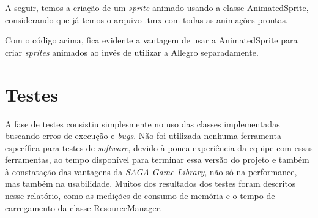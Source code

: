 \par 
A seguir, temos a criação de um \textit{sprite} animado usando a classe AnimatedSprite, considerando que já temos o arquivo .tmx com todas as animações prontas.
%

%
Com o código acima, fica evidente a vantagem de usar a AnimatedSprite para criar \textit{sprites} animados ao invés de utilizar a Allegro separadamente.
%
%
%
\section{Testes}
%
A fase de testes consistiu simplesmente no uso das classes implementadas buscando erros de execução e \textit{bugs}. Não foi utilizada nenhuma ferramenta específica para testes de \textit{software}, devido à pouca experiência da equipe com essas ferramentas, ao tempo disponível para terminar essa versão do projeto e também à constatação das vantagens da \textit{SAGA Game Library}, não só na performance, mas também na usabilidade. Muitos dos resultados dos testes foram descritos nesse relatório, como as medições de consumo de memória e o tempo de carregamento da classe ResourceManager. 
%


